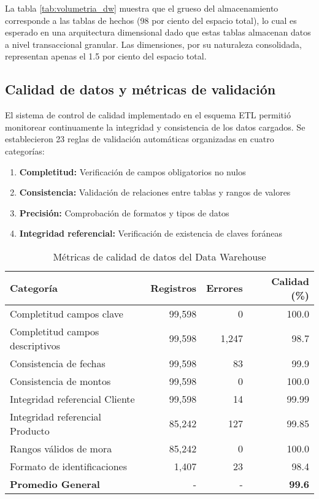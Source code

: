 La tabla \ref{tab:volumetria_dw} muestra que el grueso del almacenamiento corresponde a las tablas de hechos (98 por ciento del espacio total), lo cual es esperado en una arquitectura dimensional dado que estas tablas almacenan datos a nivel transaccional granular. Las dimensiones, por su naturaleza consolidada, representan apenas el 1.5 por ciento del espacio total.

\subsection{Calidad de datos y métricas de validación}

El sistema de control de calidad implementado en el esquema ETL permitió monitorear continuamente la integridad y consistencia de los datos cargados. Se establecieron 23 reglas de validación automáticas organizadas en cuatro categorías:

\begin{enumerate}
    \item \textbf{Completitud:} Verificación de campos obligatorios no nulos
    \item \textbf{Consistencia:} Validación de relaciones entre tablas y rangos de valores
    \item \textbf{Precisión:} Comprobación de formatos y tipos de datos
    \item \textbf{Integridad referencial:} Verificación de existencia de claves foráneas
\end{enumerate}

\begin{table}[ht]
\centering
\begin{tabular}{|l|r|r|r|}
\hline
\textbf{Categoría} & \textbf{Registros} & \textbf{Errores} & \textbf{Calidad (\%)} \\
\hline
Completitud campos clave & 99,598 & 0 & 100.0 \\
Completitud campos descriptivos & 99,598 & 1,247 & 98.7 \\
Consistencia de fechas & 99,598 & 83 & 99.9 \\
Consistencia de montos & 99,598 & 0 & 100.0 \\
Integridad referencial Cliente & 99,598 & 14 & 99.99 \\
Integridad referencial Producto & 85,242 & 127 & 99.85 \\
Rangos válidos de mora & 85,242 & 0 & 100.0 \\
Formato de identificaciones & 1,407 & 23 & 98.4 \\
\hline
\textbf{Promedio General} & - & - & \textbf{99.6} \\
\hline
\end{tabular}
\caption{Métricas de calidad de datos del Data Warehouse}
\end{table}

